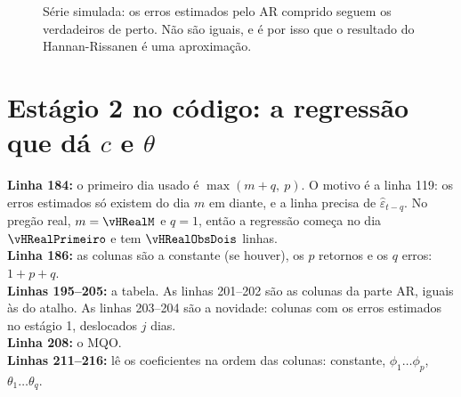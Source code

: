 \documentclass[11pt,a4paper]{article}
\newcommand{\arq}[1]{../../../dados/resultados/hannan_rissanen_2026-10-30/#1}
\newcommand{\cod}[1]{../../../tg/codigo/#1}
\newcommand{\trecho}[4]{}
\begin{document}
\begin{figure}[htbp]\centering
{}
\caption{Série simulada: os erros estimados pelo AR comprido seguem os verdadeiros de perto. Não são iguais, e é por
isso que o resultado do Hannan-Rissanen é uma aproximação.}
\label{fig:erros}
\end{figure}

\section{Estágio 2 no código: a regressão que dá $c$ e $\theta$}\label{sec:estagio2}

\trecho{\cod{Arima.mqh}}{184}{217}{tg/codigo/Arima.mqh}

\begin{leitura}
\textbf{Linha 184:} o primeiro dia usado é $\max(m + q,\ p)$. O motivo é a linha 119: os erros estimados só existem
do dia $m$ em diante, e a linha precisa de $\hat\varepsilon_{t-q}$. No pregão real, $m = \vHRealM$ e $q = 1$, então a
regressão começa no dia $\vHRealPrimeiro$ e tem $\vHRealObsDois$ linhas.\\
\textbf{Linha 186:} as colunas são a constante (se houver), os $p$ retornos e os $q$ erros: $1 + p + q$.\\
\textbf{Linhas 195--205:} a tabela. As linhas 201--202 são as colunas da parte AR, iguais às do atalho. As linhas
203--204 são a novidade: colunas com os erros estimados no estágio 1, deslocados $j$ dias.\\
\textbf{Linha 208:} o MQO.\\
\textbf{Linhas 211--216:} lê os coeficientes na ordem das colunas: constante, $\phi_1 \dots \phi_p$,
$\theta_1 \dots \theta_q$.
\end{leitura}
\end{document}
